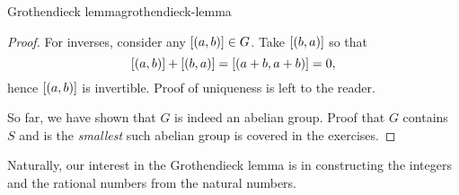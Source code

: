 \documentclass[master.tex]{subfiles}
\begin{document}
\begin{lemma}{Grothendieck lemma}{grothendieck-lemma}
\begin{proof}
                For inverses, consider any $\left[ (a, b) \right] \in G$.
                Take $\left[ (b, a) \right]$ so that
                \[
                    \left[ (a, b) \right] + \left[ (b, a) \right] = \left[ (a + b, a + b) \right] = 0
                ,\]
                hence $\left[ (a, b) \right]$ is invertible.
                Proof of uniqueness is left to the reader.

                So far, we have shown that $G$ is indeed an abelian group.
                Proof that $G$ contains $S$ and is the \emph{smallest} such abelian group is covered in the exercises.
            \end{proof}
        \end{lemma}

        Naturally, our interest in the Grothendieck lemma is in constructing the integers and the rational numbers from the natural numbers.
\end{document}
